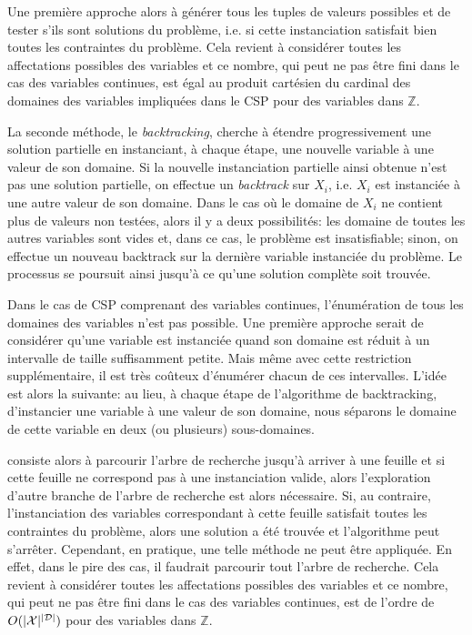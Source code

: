 \begin{itemize}
Une première approche alors à générer tous les tuples de valeurs
possibles et de tester s'ils sont solutions du problème, i.e. si cette
instanciation satisfait bien toutes les contraintes du problème.  Cela
revient à considérer toutes les affectations possibles des variables
et ce nombre, qui peut ne pas être fini dans le cas des variables
continues, est égal au produit cartésien du cardinal des domaines des
variables impliquées dans le CSP pour des variables dans
$\mathbb{Z}$.

La seconde méthode, le {\it backtracking}, cherche à étendre
progressivement une solution partielle en instanciant, à chaque
étape, une nouvelle variable à une valeur de son domaine. Si la
nouvelle instanciation partielle ainsi obtenue n'est pas une solution
partielle, on effectue un {\it backtrack} sur $X_i$, i.e. $X_i$ est
instanciée à une autre valeur de son domaine. Dans le cas où le
domaine de $X_i$ ne contient plus de valeurs non testées, alors il y a
deux possibilités: les domaine de toutes les autres variables sont
vides et, dans ce cas, le problème est insatisfiable; sinon, on
effectue un nouveau backtrack sur la dernière variable instanciée du
problème. Le processus se poursuit ainsi jusqu'à ce qu'une solution
complète soit trouvée. 

Dans le cas de CSP comprenant des variables continues, l'énumération
de tous les domaines des variables n'est pas possible. Une première
approche serait de considérer qu'une variable est instanciée quand son
domaine est réduit à un intervalle de taille suffisamment petite. Mais
même avec cette restriction supplémentaire, il est très coûteux
d'énumérer chacun de ces intervalles. L'idée est alors la suivante: au
lieu, à chaque étape de l'algorithme de backtracking, d'instancier une
variable à une valeur de son domaine, nous séparons le domaine de
cette variable en deux (ou plusieurs) sous-domaines.

consiste alors à parcourir l'arbre de recherche
jusqu'à arriver à une feuille et si cette feuille ne correspond pas à
une instanciation valide, alors l'exploration d'autre branche de
l'arbre de recherche est alors nécessaire. Si, au contraire,
l'instanciation des variables correspondant à cette feuille satisfait
toutes les contraintes du problème, alors une solution a été trouvée
et l'algorithme peut s'arrêter. Cependant, en pratique, une telle
méthode ne peut être appliquée. En effet, dans le pire des cas, il
faudrait parcourir tout l'arbre de recherche. Cela revient à
considérer toutes les affectations possibles des variables et ce
nombre, qui peut ne pas être fini dans le cas des variables continues,
est de l'ordre de $O(|{\cal X}|^{|{\cal D}|})$ pour des variables dans
$\mathbb{Z}$.


\end{itemize}
